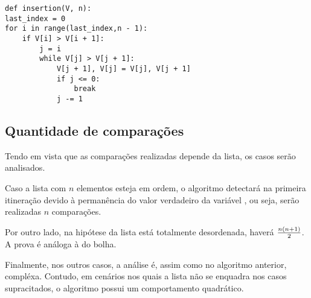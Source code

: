 \begin{lstlisting}
def insertion(V, n):
last_index = 0
for i in range(last_index,n - 1):
    if V[i] > V[i + 1]:
        j = i
        while V[j] > V[j + 1]:
            V[j + 1], V[j] = V[j], V[j + 1]
            if j <= 0:
                break
            j -= 1
\end{lstlisting}

\subsection{Quantidade de comparações}
Tendo em vista que as comparações realizadas depende da lista, os casos serão analisados. 

Caso a lista com $n$ elementos esteja em ordem, o algoritmo detectará na primeira itineração devido à permanência do valor verdadeiro da variável , ou seja, serão realizadas $n$ comparações.

Por outro lado, na hipótese da lista está totalmente desordenada, haverá $n(n+1)\over 2$. A prova é análoga à do bolha.

Finalmente, nos outros casos, a análise é, assim como no algoritmo anterior, compléxa. Contudo, em cenários nos quais a lista não se enquadra nos casos supracitados, o algoritmo possui um comportamento quadrático.
